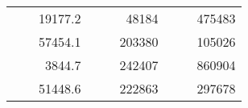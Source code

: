 \begin{table}[H]
\begin{tabular}{|ccrccrccc}
\rowcolor[HTML]{DDFDFF} 
\multicolumn{1}{|c|}{\cellcolor[HTML]{FFFFC7}}                                & \multicolumn{1}{c|}{\cellcolor[HTML]{DDFDFF}}                      & \multicolumn{1}{r|}{\cellcolor[HTML]{DAE8FC}19177.2}   & \multicolumn{1}{c|}{\cellcolor[HTML]{FFFFC7}}                                & \multicolumn{1}{c|}{\cellcolor[HTML]{DDFDFF}}                       & \multicolumn{1}{r|}{\cellcolor[HTML]{DDFDFF}48184}     & \multicolumn{1}{c|}{\cellcolor[HTML]{FFFFC7}}                                & \multicolumn{1}{c|}{\cellcolor[HTML]{DDFDFF}}                      & \multicolumn{1}{r|}{\cellcolor[HTML]{DDFDFF}475483}    \\ \cline{3-3} \cline{6-6} \cline{9-9} 
\multicolumn{1}{|c|}{\cellcolor[HTML]{FFFFC7}}                                & \multicolumn{1}{c|}{\cellcolor[HTML]{DDFDFF}}                      & \multicolumn{1}{r|}{\cellcolor[HTML]{DDFDFF}57454.1}   & \multicolumn{1}{c|}{\cellcolor[HTML]{FFFFC7}}                                & \multicolumn{1}{c|}{\cellcolor[HTML]{DDFDFF}}                       & \multicolumn{1}{r|}{\cellcolor[HTML]{DAE8FC}203380}    & \multicolumn{1}{c|}{\cellcolor[HTML]{FFFFC7}}                                & \multicolumn{1}{c|}{\cellcolor[HTML]{DDFDFF}}                      & \multicolumn{1}{r|}{\cellcolor[HTML]{DAE8FC}105026}    \\ \cline{3-3} \cline{6-6} \cline{9-9} 
\rowcolor[HTML]{DDFDFF} 
\multicolumn{1}{|c|}{\cellcolor[HTML]{FFFFC7}}                                & \multicolumn{1}{c|}{\cellcolor[HTML]{DDFDFF}}                      & \multicolumn{1}{r|}{\cellcolor[HTML]{DAE8FC}3844.7}    & \multicolumn{1}{c|}{\cellcolor[HTML]{FFFFC7}}                                & \multicolumn{1}{c|}{\cellcolor[HTML]{DDFDFF}}                       & \multicolumn{1}{r|}{\cellcolor[HTML]{DDFDFF}242407}    & \multicolumn{1}{c|}{\cellcolor[HTML]{FFFFC7}}                                & \multicolumn{1}{c|}{\cellcolor[HTML]{DDFDFF}}                      & \multicolumn{1}{r|}{\cellcolor[HTML]{DDFDFF}860904}    \\ \cline{3-3} \cline{6-6} \cline{9-9} 
\multicolumn{1}{|c|}{\cellcolor[HTML]{FFFFC7}}                                & \multicolumn{1}{c|}{\cellcolor[HTML]{DDFDFF}}                      & \multicolumn{1}{r|}{\cellcolor[HTML]{DDFDFF}51448.6}   & \multicolumn{1}{c|}{\cellcolor[HTML]{FFFFC7}}                                & \multicolumn{1}{c|}{\cellcolor[HTML]{DDFDFF}}                       & \multicolumn{1}{r|}{\cellcolor[HTML]{DAE8FC}222863}    & \multicolumn{1}{c|}{\cellcolor[HTML]{FFFFC7}}                                & \multicolumn{1}{c|}{\cellcolor[HTML]{DDFDFF}}                      & \multicolumn{1}{r|}{\cellcolor[HTML]{DAE8FC}297678}    \\ \cline{3-3} \cline{6-6} \cline{9-9} 

\end{tabular}
\end{table}
